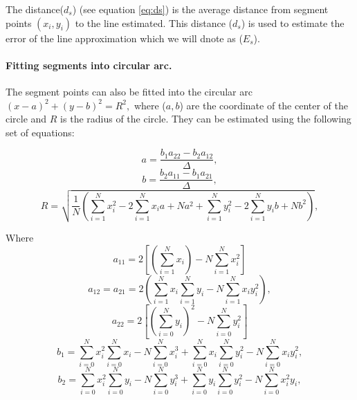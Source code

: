 The distance($d_s$) (see equation \ref{eq:ds}) is the average distance from segment points $(x_i, y_i)$ to the  line estimated. This distance ($d_s$) is used to estimate the error of the line approximation which we will dnote as ($E_s$). 


\paragraph{Fitting segments into circular arc.}
\label{sec:FittingSegmentcirculararc}
The segment points can also be fitted into the circular arc $(x - a)^2  + (y - b)^2  = R^2, $ where ($a,b$) are the coordinate of the center of the circle and $R$ is the radius of the circle. They can be estimated using the following set of equations: 
 
\begin{equation}
a = \frac{{b_{1}a_{22} - b_{2}a_{12}}}{\Delta},
\end{equation}
\begin{equation}
	b = \frac{{b_{2}a_{11} - b_{1}a_{21}}}{\Delta},
\end{equation}
\begin{equation}
R = \sqrt {\frac{1}{N}(\sum\limits_{i = 1}^N {x_i^2 }  - 2\sum\limits_{i = 1}^N {x_i a}  + Na^2  + \sum\limits_{i = 1}^N {y_i^2  - 2} \sum\limits_{i = 1}^N {y_i b + Nb^2 } )} ,
\end{equation}

Where 
\begin{equation}
a_{11}  = 2\left[ {\left( {\sum\limits_{i = 1}^N {x_i } } \right) - N\sum\limits_{i = 1}^N {x_i^2 } } \right]
\end{equation}
\begin{equation}
a_{12}  = a_{21}  = 2\left( {\sum\limits_{i = 1}^N {x_i \sum\limits_{i = 1}^N {y_i } }  - N\sum\limits_{i = 1}^N {x_i y_i^2 } } \right),
\end{equation}
\begin{equation}
 a_{22}  = 2\left[ {\left( {\sum\limits_{i = 0}^N {y_i } } \right)^2  - N\sum\limits_{i = 0}^N {y_i^2 } } \right]
\end{equation}
\begin{equation}
b_1  = \sum\limits_{i = 0}^N {x_i^2 } \sum\limits_{i = 0}^N {x_i }  - N\sum\limits_{i = 0}^N {x_i^3 }  + \sum\limits_{i = 0}^N {x_i } \sum\limits_{i = 0}^N {y_i^2 }  - N\sum\limits_{i = 0}^N {x_i y_i^2 } , 
\end{equation}
\begin{equation}
b_2  = \sum\limits_{i = 0}^N {x_i^2 } \sum\limits_{i = 0}^N {y_i }  - N\sum\limits_{i = 0}^N {y_i^3 }  + \sum\limits_{i = 0}^N {y_i } \sum\limits_{i = 0}^N {y_i^2 }  - N\sum\limits_{i = 0}^N {x_i^2 y_i } ,
\end{equation}

